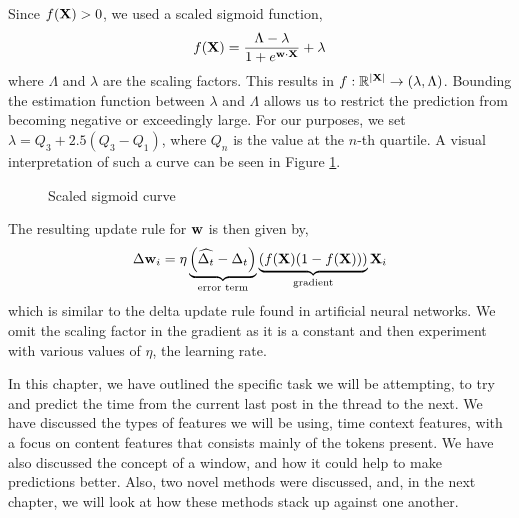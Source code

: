 Since $f(\mathbf{X}) > 0$, we used a scaled sigmoid function,
\[
	f(\mathbf{X}) = \frac{\Lambda-\lambda}{1 + e^{\mathbf{w} \cdot \mathbf{X}}} + \lambda
\]
where $\Lambda$ and $\lambda$ are the scaling factors. This results in $f: 
\mathbb{R}^{|\mathbf{X}|}  \rightarrow (\lambda,\Lambda)$. Bounding the estimation 
function between $\lambda$ and $\Lambda$ allows us to restrict the prediction 
from becoming negative or exceedingly large. For our purposes, we set 
$\lambda = Q_3 + 2.5(Q_{3} - Q_{1})$, where $Q_n$ is the value at the $n$-th 
quartile. A visual interpretation of such a curve can be seen in Figure 
\ref{fig:scaled_sigmoid}.
\begin{figure}
\begin{center}
\end{center}
\caption{Scaled sigmoid curve}\label{fig:scaled_sigmoid}
\end{figure}

The resulting update rule for $\mathbf{w}$ is then given by,
\[
	\Delta \mathbf{w}_i = \eta
				\underbrace{\left(\widehat{\Delta_t} - \Delta_t \right)}_{\text{error term}}
				\underbrace{\left( f(\mathbf{X})(1-f(\mathbf{X})) \right)}_{\text{gradient}}
						\mathbf{X}_i
\]
which is similar to the delta update rule found in artificial neural networks.  
We omit the scaling factor in the gradient as it is a constant and then 
experiment with various values of $\eta$, the learning rate. 

In this chapter, we have outlined the specific task we will be attempting, to 
try and predict the time from the current last post in the thread to the next.
We have discussed the types of features we will be using, time context features, 
with a focus on content features that consists mainly of the tokens present. We 
have also discussed the concept of a window, and how it could help to make 
predictions better. Also, two novel methods were discussed, and, in the next 
chapter, we will look at how these methods stack up against one another.

